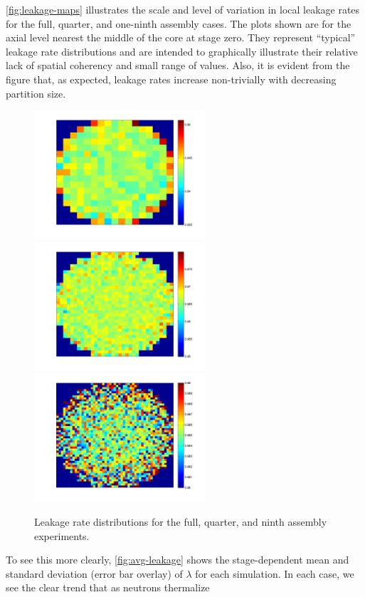 \autoref{fig:leakage-maps} illustrates the scale and level of variation in local
leakage rates for the full, quarter, and one-ninth assembly cases.  The plots
shown are for the axial level nearest the middle of the core at stage zero. They
represent ``typical'' leakage rate distributions and are intended to graphically
illustrate their relative lack of spatial coherency and small range of
values. Also, it is evident from the figure that, as expected, leakage rates
increase non-trivially with decreasing partition size.
\begin{figure}[ht!]
  \centering
  \includegraphics[width=2.5in]{figures/ch5/leakage_map1.png}
  \includegraphics[width=2.5in]{figures/ch5/leakage_map1_4.png}
  \includegraphics[width=2.5in]{figures/ch5/leakage_map1_9.png}
  \caption{Leakage rate distributions for the full, quarter, and ninth assembly
    experiments.}
  \label{fig:leakage-maps}
\end{figure}
To see this more clearly, \autoref{fig:avg-leakage} shows the stage-dependent
mean and standard deviation (error bar overlay) of $\lambda$ for each
simulation.  In each case, we see the clear trend that as neutrons thermalize
